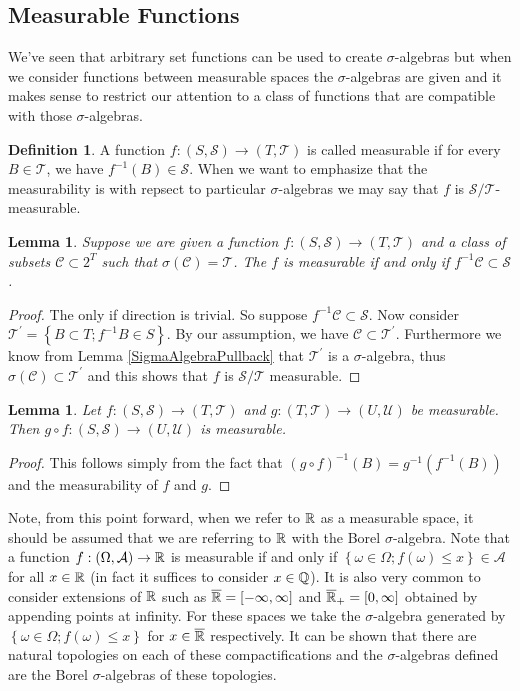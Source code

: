 \documentclass{amsart}
\newtheorem{lem}[thm]{Lemma}
\theoremstyle{remark}
\theoremstyle{definition}
\newtheorem{defn}[thm]{Definition}
\begin{document}
\subsection{Measurable Functions}
We've seen that arbitrary set functions can be used to create
$\sigma$-algebras but when we consider functions between
measurable spaces the $\sigma$-algebras are given and it makes sense
to restrict our attention to a class of functions that are compatible
with those $\sigma$-algebras.
\begin{defn}A function $f : (S,\mathcal{S}) \to (T,\mathcal{T})$ is
  called measurable if for every $B \in \mathcal{T}$, we have
  $f^{-1}(B) \in \mathcal{S}$.  When we want to emphasize that the
  measurability is with repsect to particular $\sigma$-algebras we may
  say that $f$ is $\mathcal{S}/\mathcal{T}$-measurable.
\end{defn}
\begin{lem}\label{MeasurableByGeneratingSet}Suppose we are given a function $f : (S,\mathcal{S}) \to
  (T,\mathcal{T})$ and a class of subsets $\mathcal{C} \subset 2^T$
  such that $\sigma(\mathcal{C}) = \mathcal{T}$.  The $f$ is
  measurable if and only if $f^{-1} \mathcal{C} \subset \mathcal{S}$.
\end{lem}
\begin{proof}The only if direction is trivial.  So suppose $f^{-1}  \mathcal{C} \subset \mathcal{S}$.
Now consider $\mathcal{T}^\prime = \left \{ B \subset T; f^{-1} B \in
  S \right \}$.  By our assumption, we have $\mathcal{C} \subset
\mathcal{T}^\prime$.  Furthermore we know from
Lemma \ref{SigmaAlgebraPullback} that $\mathcal{T}^\prime$ is
a $\sigma$-algebra, thus $\sigma(\mathcal{C}) \subset
\mathcal{T}^\prime$ and this shows that $f$ is
$\mathcal{S}/\mathcal{T}$ measurable.
\end{proof}
\begin{lem}\label{CompositionOfMeasurable}Let $f:(S,\mathcal{S}) \to (T,\mathcal{T})$
  and $g:(T,\mathcal{T}) \to (U,\mathcal{U})$ be measurable.  Then $g
  \circ f :(S,\mathcal{S}) \to (U,\mathcal{U})$ is measurable.
\end{lem}
\begin{proof}This follows simply from the fact that $(g \circ
  f)^{-1}(B) = g^{-1}(f^{-1}(B))$ and the measurability of $f$ and $g$.
\end{proof}
Note, from this point forward, when we refer to $\mathbb{R}$ as a
measurable space, it should be assumed that we are referring to
$\mathbb{R}$ with the Borel $\sigma$-algebra.  Note that a function
$f:(\Omega, \mathcal{A}) \to \mathbb{R}$ is measurable if and only if
$\left \{\omega \in \Omega ; f(\omega) \leq x \right \} \in \mathcal{A}$ for all $x \in \mathbb{R}$ (in fact
it suffices to consider $x \in \mathbb{Q}$).  It is also very common to consider
extensions of $\mathbb{R}$ such as $\overline{\mathbb{R}} = [-\infty,\infty]$
and $\overline{\mathbb{R}}_+ = [0,\infty]$
obtained by appending points at infinity.  For these spaces we take the $\sigma$-algebra
generated by $\left \{\omega \in \Omega ; f(\omega) \leq x \right \}$
for $x \in \overline{\mathbb{R}}$ respectively.  It can be shown that
there are natural topologies on each of these compactifications and
the $\sigma$-algebras defined are the Borel $\sigma$-algebras of these topologies.
\end{document}
